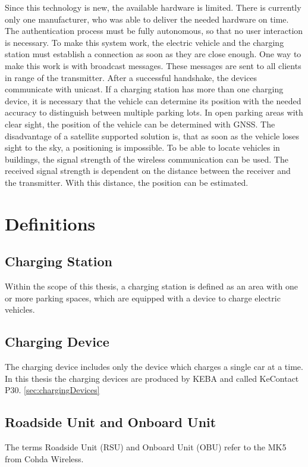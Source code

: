 Since this technology is new, the available hardware is limited. There is currently only one manufacturer, who was able to deliver the needed hardware on time. The authentication process must be fully autonomous, so that no user interaction is necessary. To make this system work, the electric vehicle and the charging station must establish a connection as soon as they are close enough. One way to make this work is with broadcast messages. These messages are sent to all clients in range of the transmitter. After a successful handshake, the devices communicate with unicast.
If a charging station has more than one charging device, it is necessary that the vehicle can determine its position with the needed accuracy to distinguish between multiple parking lots. In open parking areas with clear sight, the position of the vehicle can be determined with GNSS. The disadvantage of a satellite supported solution is, that as soon as the vehicle loses sight to the sky, a positioning is impossible. To be able to locate vehicles in buildings, the signal strength of the wireless communication can be used. The received signal strength is dependent on the distance between the receiver and the transmitter. With this distance, the position can be estimated.\cite{RSSI}

\section{Definitions}
\subsection*{Charging Station}
Within the scope of this thesis, a charging station is defined as an area with one or more parking spaces, which are equipped with a device to charge electric vehicles.
\subsection*{Charging Device}
The charging device includes only the device which charges a single car at a time. In this thesis the charging devices are produced by KEBA and called KeContact P30. \ref{sec:chargingDevices}
\subsection*{Roadside Unit and Onboard Unit}
The terms Roadside Unit (RSU) and Onboard Unit (OBU) refer to the MK5 from Cohda Wireless.


\clearpage
\pagebreak
